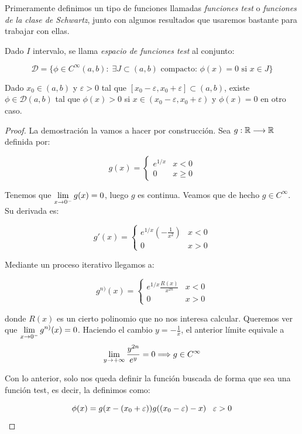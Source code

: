 Primeramente definimos un tipo de funciones llamadas \textit{funciones test} o \textit{funciones de la clase de Schwartz}, junto con algunos resultados que usaremos bastante para trabajar con ellas.

\begin{definition}
\label{funcionestest}
Dado $I$ intervalo, se llama \textit{espacio de funciones test} al conjunto:

\[
\mathcal{D} = \{\phi\in C^{\infty}(a,b): \; \exists J\subset(a,b) \text{ compacto: } \phi(x)=0 \text{ si } x \in J\}
\]
\end{definition}

\begin{lemma}
\label{existanciaphi}
Dado $x_0\in(a,b)$ y $\varepsilon>0$ tal que $[x_0-\varepsilon, x_0+\varepsilon]\subset(a,b)$, existe $\phi\in\mathcal{D}(a,b)$ tal que $\phi(x)>0$ si $x\in(x_0-\varepsilon,x_0+\varepsilon)$ y $\phi(x)=0$ en otro caso.
\end{lemma}

\begin{proof}
La demostración la vamos a hacer por construcción. Sea $g : \mathbb{R} \longrightarrow \mathbb{R}$ definida por:

\[
g(x)=\left\{
\begin{array}{cc}
e^{1/x} & x<0 \\
0 & x\geq 0

\end{array}
\right.
\]

Tenemos que $\displaystyle\lim_{ x \to 0^- } g(x)=0$, luego $g$ es continua. Veamos que de hecho $g\in C^{\infty}$. Su derivada es:

\[
g'(x)=\left\{
\begin{array}{cc}
e^{1/x}\left(-\frac{1}{x^2}\right) & x<0 \\
0 & x> 0

\end{array}
\right.
\]

Mediante un proceso iterativo llegamos a:

\[
g^{n)}(x)=\left\{
\begin{array}{cc}
e^{1/x}\frac{R(x)}{x^{2n}} & x<0 \\
0 & x> 0

\end{array}
\right.
\]

donde $R(x)$ es un cierto polinomio que no nos interesa calcular. Queremos ver que $\displaystyle\lim_{ x \to 0^- } g^{n)}(x)=0$. Haciendo el cambio $y=-\frac{1}{x}$, el anterior límite equivale a 
\[
\displaystyle\lim_{ y \to +\infty } \frac{y^{2n}}{e^y}=0 \Longrightarrow g\in C^{\infty}
\]

Con lo anterior, solo nos queda definir la función buscada de forma que sea una función test, es decir, la definimos como:

\[
\phi(x)=g(x-(x_0+\varepsilon))g((x_0-\varepsilon)-x) \;\;\; \varepsilon>0 
\]

\end{proof}


